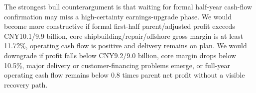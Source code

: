 The strongest bull counterargument is that waiting for formal half-year cash-flow confirmation may miss a high-certainty earnings-upgrade phase. We would become more constructive if formal first-half parent/adjusted profit exceeds CNY10.1/9.9 billion, core shipbuilding/repair/offshore gross margin is at least 11.72\%, operating cash flow is positive and delivery remains on plan. We would downgrade if profit falls below CNY9.2/9.0 billion, core margin drops below 10.5\%, major delivery or customer-financing problems emerge, or full-year operating cash flow remains below 0.8 times parent net profit without a visible recovery path.

\clearpage
